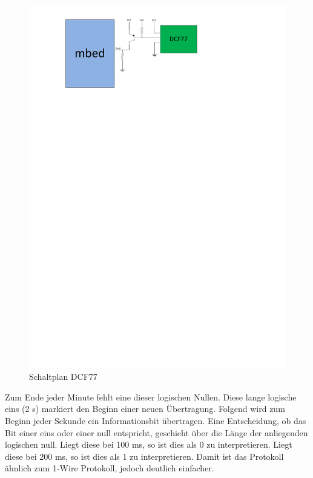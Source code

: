 			\begin{figure}[H]
				\centering
				\includegraphics[width=\textwidth]{Schaltplaene/DCF77_Schaltung}
				\caption{Schaltplan DCF77}
				\label{fig:DCF77-Plan}
			\end{figure}

			
			\newpage
			Zum Ende jeder Minute fehlt eine dieser logischen Nullen. Diese lange logische eins (2 s) markiert den Beginn einer neuen Übertragung. Folgend wird zum Beginn jeder Sekunde ein Informationsbit übertragen. Eine Entscheidung, ob das Bit einer eins oder einer null entspricht, geschieht über die Länge der anliegenden logischen null. Liegt diese bei 100 ms, so ist dies als 0 zu interpretieren. Liegt diese bei 200 ms, so ist dies als 1 zu interpretieren. Damit ist das Protokoll ähnlich zum 1-Wire Protokoll, jedoch deutlich einfacher.
			
